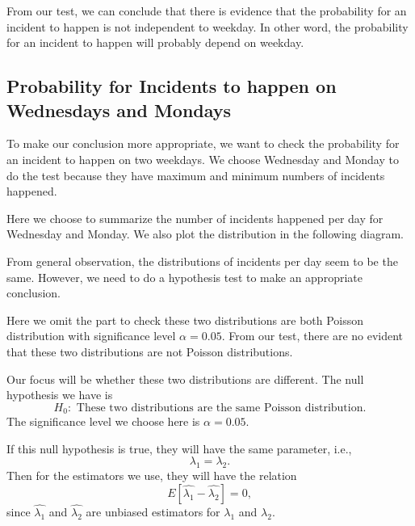 \documentclass[11pt,a4paper,english]{article}
\begin{document}
From our test, we can conclude that there is evidence that the probability for an incident to happen is not independent to weekday. In other word, the probability for an incident to happen will probably depend on weekday.

\subsection{Probability for Incidents to happen on Wednesdays and Mondays}
To make our conclusion more appropriate, we want to check the probability for an incident to happen on two weekdays. 
We choose Wednesday and Monday to do the test because they have maximum and minimum numbers of incidents happened.

Here we choose to summarize the number of incidents happened per day for Wednesday and Monday. We also plot the distribution in the following diagram.

From general observation, the distributions of incidents per day seem to be the same. However, we need to do a hypothesis test to make an appropriate conclusion.

Here we omit the part to check these two distributions are both Poisson distribution with significance level $\alpha = 0.05$. From our test, there are no evident that these two distributions are not Poisson distributions.

Our focus will be whether these two distributions are different. The null hypothesis we have is 
\begin{equation*}
	H_{0}:\text{ These two distributions are the same Poisson distribution.}
\end{equation*}
The significance level we choose here is $\alpha = 0.05$.

If this null hypothesis is true, they will have the same parameter, i.e.,
\begin{equation*}
	\lambda_{1} = \lambda_{2}.
\end{equation*}
Then for the estimators we use, they will have the relation
\begin{equation*}
	E[\hat{\lambda_{1}}-\hat{\lambda_{2}}] = 0,
\end{equation*}
since $\hat{\lambda_{1}}$ and $\hat{\lambda_{2}}$ are unbiased estimators for $\lambda_{1}$ and $\lambda_{2}$.
\end{document}
